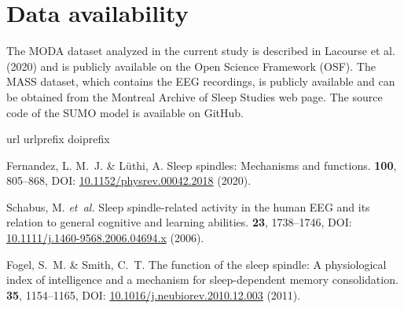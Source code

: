 \documentclass[fleqn,twocolumn,10pt]{wlscirep}
\begin{document}
\section*{Data availability}

The MODA dataset analyzed in the current study is described in Lacourse et
al. (2020)\cite{Lacourse2020} and is publicly available on the Open Science Framework
(OSF)\cite{Yetton2020}. The MASS dataset\cite{OReilly2014}, which contains the EEG 
recordings, is publicly available and can be obtained from the Montreal Archive
of Sleep Studies web page\cite{MASS2020}. The source code of the SUMO model is available on GitHub\cite{Kaulen2022a}.

\begin{thebibliography}{10}
  \expandafter\ifx\csname url\endcsname\relax
    \def\url#1{\texttt{#1}}\fi
  \expandafter\ifx\csname urlprefix\endcsname\relax\def\urlprefix{URL }\fi
  \expandafter\ifx\csname doiprefix\endcsname\relax\def\doiprefix{DOI: }\fi
  \providecommand{\bibinfo}[2]{#2}
  \providecommand{\eprint}[2][]{\href{#1}{#2}}
  
  \bibinfo{author}{Fernandez, L. M.~J.} \& \bibinfo{author}{L\"{u}thi, A.}
  \newblock \bibinfo{journal}{\bibinfo{title}{Sleep spindles: Mechanisms and
    functions}}.
   \textbf{\bibinfo{volume}{100}},
    \bibinfo{pages}{805--868},
    \doiprefix\href{http://doi.org/10.1152/physrev.00042.2018}{10.1152/physrev.00042.2018}
    (\bibinfo{year}{2020}).
  
  \bibinfo{author}{Schabus, M.} \emph{et~al.}
  \newblock \bibinfo{journal}{\bibinfo{title}{Sleep spindle-related activity in
    the human {EEG} and its relation to general cognitive and learning
    abilities}}.
    \textbf{\bibinfo{volume}{23}}, \bibinfo{pages}{1738--1746},
    \doiprefix\href{http://doi.org/10.1111/j.1460-9568.2006.04694.x}{10.1111/j.1460-9568.2006.04694.x}
    (\bibinfo{year}{2006}).
  
  \bibinfo{author}{Fogel, S.~M.} \& \bibinfo{author}{Smith, C.~T.}
  \newblock \bibinfo{journal}{\bibinfo{title}{The function of the sleep spindle:
    A physiological index of intelligence and a mechanism for sleep-dependent
    memory consolidation}}.
    \textbf{\bibinfo{volume}{35}}, \bibinfo{pages}{1154--1165},
    \doiprefix\href{http://doi.org/10.1016/j.neubiorev.2010.12.003}{10.1016/j.neubiorev.2010.12.003}
    (\bibinfo{year}{2011}).
  

\end{thebibliography}
\end{document}
